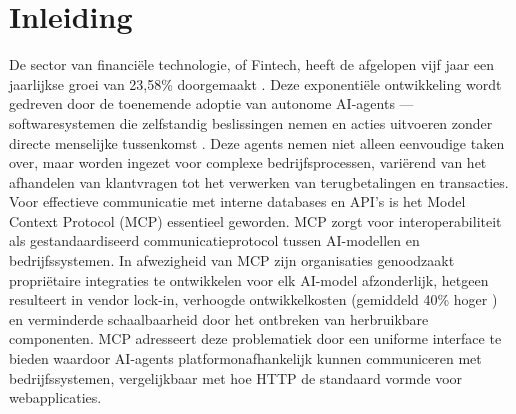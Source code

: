 


% 

\section{Inleiding}%
\label{sec:inleiding}

De sector van financiële technologie, of Fintech, heeft de afgelopen vijf jaar een jaarlijkse groei van 23,58\% doorgemaakt \autocite{statista2024fintechgrowth}. Deze exponentiële ontwikkeling wordt gedreven door de toenemende adoptie van autonome AI-agents — softwaresystemen die zelfstandig beslissingen nemen en acties uitvoeren zonder directe menselijke tussenkomst \autocite{russell2021artificialintelligence}. Deze agents nemen niet alleen eenvoudige taken over, maar worden ingezet voor complexe bedrijfsprocessen, variërend van het afhandelen van klantvragen tot het verwerken van terugbetalingen en transacties. Voor effectieve communicatie met interne databases en API's is het Model Context Protocol (MCP) essentieel geworden. MCP zorgt voor interoperabiliteit als gestandaardiseerd communicatieprotocol tussen AI-modellen en bedrijfssystemen. In afwezigheid van MCP zijn organisaties genoodzaakt propriëtaire integraties te ontwikkelen voor elk AI-model afzonderlijk, hetgeen resulteert in vendor lock-in, verhoogde ontwikkelkosten (gemiddeld 40\% hoger \autocite{anthropic2024mcpwhitepaper}) en verminderde schaalbaarheid door het ontbreken van herbruikbare componenten. MCP adresseert deze problematiek door een uniforme interface te bieden waardoor AI-agents platformonafhankelijk kunnen communiceren met bedrijfssystemen, vergelijkbaar met hoe HTTP de standaard vormde voor webapplicaties.

